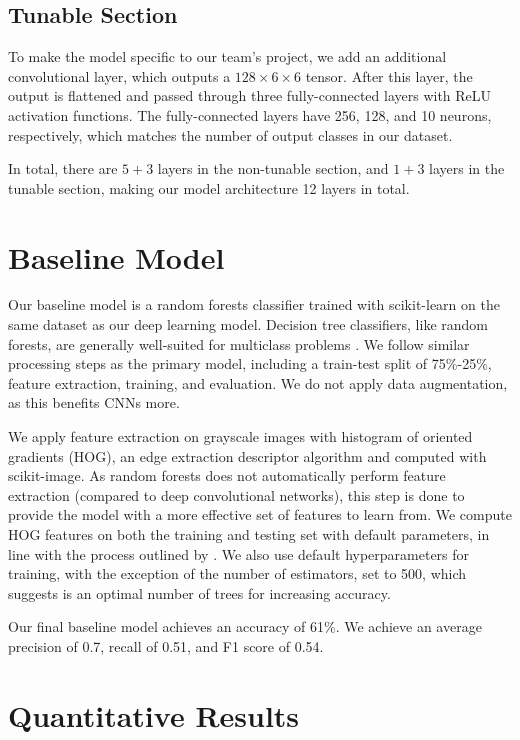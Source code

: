 \documentclass{article} %
\begin{document}
\subsection{Tunable Section}
\label{sec:tunable_section}
To make the model specific to our team's project, we add an additional convolutional layer, which outputs a $128\times6\times6$ tensor. After this layer, the output is flattened and passed through three fully-connected layers with ReLU activation functions. The fully-connected layers have 256, 128, and 10 neurons, respectively, which matches the number of output classes in our dataset.

In total, there are $5+3$ layers in the non-tunable section, and $1+3$ layers in the tunable section, making our model architecture 12 layers in total.

\section{Baseline Model}
\label{sec:baseline}
Our baseline model is a random forests classifier trained with scikit-learn on the same dataset as our deep learning model. Decision tree classifiers, like random forests, are generally well-suited for multiclass problems \citep{GallRazaviEtAl.IntroductionRandomForests.2012}. We follow similar processing steps as the primary model, including a train-test split of 75\%-25\%, feature extraction, training, and evaluation. We do not apply data augmentation, as this benefits CNNs more.

We apply feature extraction on grayscale images with histogram of oriented gradients (HOG), an edge extraction descriptor algorithm \citep{N.DalalB.Triggs.HistogramsOrientedGradients.2005} and computed with scikit-image. As random forests does not automatically perform feature extraction (compared to deep convolutional networks), this step is done to provide the model with a more effective set of features to learn from. We compute HOG features on both the training and testing set with default parameters, in line with the process outlined by \cite{Dutta.RandomForestImage.2024}. We also use default hyperparameters for training, with the exception of the number of estimators, set to 500, which suggests is an optimal number of trees for increasing accuracy.

Our final baseline model achieves an accuracy of 61\%. We achieve an average precision of 0.7, recall of 0.51, and F1 score of 0.54.

\section{Quantitative Results}
\label{sec:quantitative_results}
\end{document}
